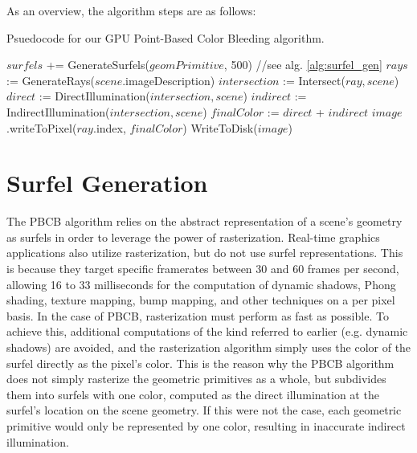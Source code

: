 As an overview, the algorithm steps are as follows:

\begin{algorithm}[H]
\captionfont
\caption[GPU PBCB Algorithm]{Psuedocode for our GPU Point-Based Color Bleeding algorithm.}
\label{alg:gpu_pbcb}
{\fontsize{10}{9}\selectfont
\begin{algorithmic}
         \State $surfels$ += GenerateSurfels($geomPrimitive$, 500) //see alg. \ref{alg:surfel_gen}
      \EndFor
      \State $rays$ := GenerateRays($scene$.imageDescription)
         \State $intersection$ := Intersect($ray, scene$)
         \State $direct$ := DirectIllumination($intersection, scene$)
         \State $indirect$ := IndirectIllumination($intersection, scene$)
         \State $finalColor$ := $direct$ + $indirect$
         \State $image$.writeToPixel($ray$.index, $finalColor$)
      \EndFor
      \State WriteToDisk($image$)
   \EndFunction
\end{algorithmic}
}
\end{algorithm}

\section{Surfel Generation}
\label{sec:surfel_generation}

The PBCB algorithm relies on the abstract representation of a scene's geometry as surfels in order to leverage the power of rasterization. Real-time graphics applications also utilize rasterization, but do not use surfel representations. This is because they target specific framerates between 30 and 60 frames per second, allowing 16 to 33 milliseconds for the computation of dynamic shadows, Phong shading, texture mapping, bump mapping, and other techniques on a per pixel basis. In the case of PBCB, rasterization must perform as fast as possible. To achieve this, additional computations of the kind referred to earlier (e.g. dynamic shadows) are avoided, and the rasterization algorithm simply uses the color of the surfel directly as the pixel's color. This is the reason why the PBCB algorithm does not simply rasterize the geometric primitives as a whole, but subdivides them into surfels with one color, computed as the direct illumination at the surfel's location on the scene geometry. If this were not the case, each geometric primitive would only be represented by one color, resulting in inaccurate indirect illumination.

